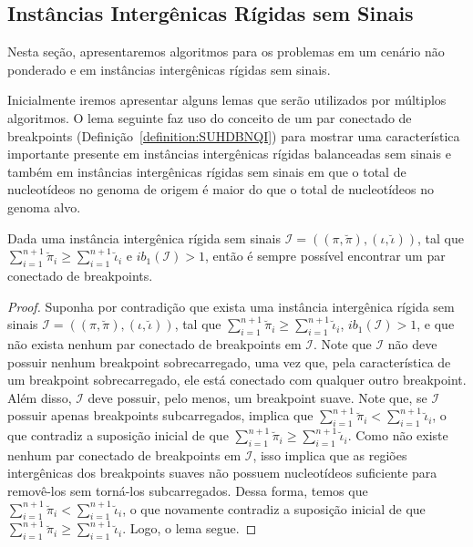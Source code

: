 \subsection{Instâncias Intergênicas Rígidas sem Sinais}

Nesta seção, apresentaremos algoritmos para os problemas em um cenário não ponderado e em instâncias intergênicas rígidas sem sinais.

Inicialmente iremos apresentar alguns lemas que serão utilizados por múltiplos algoritmos. O lema seguinte faz uso do conceito de um par conectado de breakpoints (Definição~\ref{definition:SUHDBNQI}) para mostrar uma característica importante presente em instâncias intergênicas rígidas balanceadas sem sinais e também em instâncias intergênicas rígidas sem sinais em que o total de nucleotídeos no genoma de origem é maior do que o total de nucleotídeos no genoma alvo.

\begin{lemma}\label{lemma:WYEZMYTM}
Dada uma instância intergênica rígida sem sinais $\mathcal{I}=((\pi,\breve\pi),(\iota,\breve\iota))$, tal que $\sum_{i=1}^{n+1}\breve\pi_i \ge \sum_{i=1}^{n+1}\breve\iota_i$ e $ib_1(\mathcal{I}) > 1$, então é sempre possível encontrar um par conectado de breakpoints.
\end{lemma}
\begin{proof}
Suponha por contradição que exista uma instância intergênica rígida sem sinais $\mathcal{I}=((\pi,\breve\pi),(\iota,\breve\iota))$, tal que $\sum_{i=1}^{n+1}\breve\pi_i \ge \sum_{i=1}^{n+1}\breve\iota_i$, $ib_1(\mathcal{I}) > 1$, e que não exista nenhum par conectado de breakpoints em $\mathcal{I}$. Note que $\mathcal{I}$ não deve possuir nenhum breakpoint sobrecarregado, uma vez que, pela característica de um breakpoint sobrecarregado, ele está conectado com qualquer outro breakpoint. Além disso, $\mathcal{I}$ deve possuir, pelo menos, um breakpoint suave. Note que, se $\mathcal{I}$ possuir apenas breakpoints subcarregados, implica que $\sum_{i=1}^{n+1}\breve\pi_i < \sum_{i=1}^{n+1}\breve\iota_i$, o que contradiz a suposição inicial de que $\sum_{i=1}^{n+1}\breve\pi_i \ge \sum_{i=1}^{n+1}\breve\iota_i$. Como não existe nenhum par conectado de breakpoints em $\mathcal{I}$, isso implica que as regiões intergênicas dos breakpoints suaves não possuem nucleotídeos suficiente para removê-los sem torná-los subcarregados. Dessa forma, temos que $\sum_{i=1}^{n+1}\breve\pi_i < \sum_{i=1}^{n+1}\breve\iota_i$, o que novamente contradiz a suposição inicial de que $\sum_{i=1}^{n+1}\breve\pi_i \ge \sum_{i=1}^{n+1}\breve\iota_i$. Logo, o lema segue.
\end{proof}

